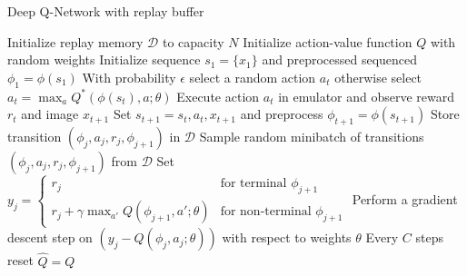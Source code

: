 \documentclass[hidelinks]{article}
\begin{document}

\begin{algorithm}
    \caption{Deep Q-Network with replay buffer}
    \label{fig:pseudo}
    \begin{algorithmic}[1]
        \State Initialize replay memory $\mathcal{D}$ to capacity $N$
        \State Initialize action-value function $Q$ with random weights 
            \State Initialize sequence $s_{1}=\{x_{1}\}$ and preprocessed sequenced $\phi_{1}=\phi(s_{1})$
                \State With probability $\epsilon$ select a random action $a_{t}$
                \State otherwise select $a_{t}=\max_{a}Q^{*}(\phi(s_{t}),a;\theta)$
                \State Execute action $a_{t}$ in emulator and observe reward $r_{t}$ and image $x_{t+1}$
                \State Set $s_{t+1}=s_{t},a_{t},x_{t+1}$ and preprocess $\phi_{t+1}=\phi(s_{t+1})$
                \State Store transition $(\phi_{j},a_{j},r_{j},\phi_{j+1})$ in $\mathcal{D}$
                \State Sample random minibatch of transitions $(\phi_{j},a_{j},r_{j},\phi_{j+1})$ from $\mathcal{D}$
                \State Set $y_{j}=
                \begin{cases}
                r_{j} & \text{for terminal }\phi_{j+1}\\
                r_{j}+\gamma\max_{a'}Q(\phi_{j+1},a';\theta) & \text{for non-terminal }\phi_{j+1}
                \end{cases}$
                \State Perform a gradient descent step on $\left(y_{j}-Q(\phi_{j},a_{j};\theta)\right)$ with respect to weights $\theta$
                \State Every $C$ steps reset $\hat{Q}=Q$
            \EndFor
        \EndFor
    \end{algorithmic}
\end{algorithm}
\end{document}
